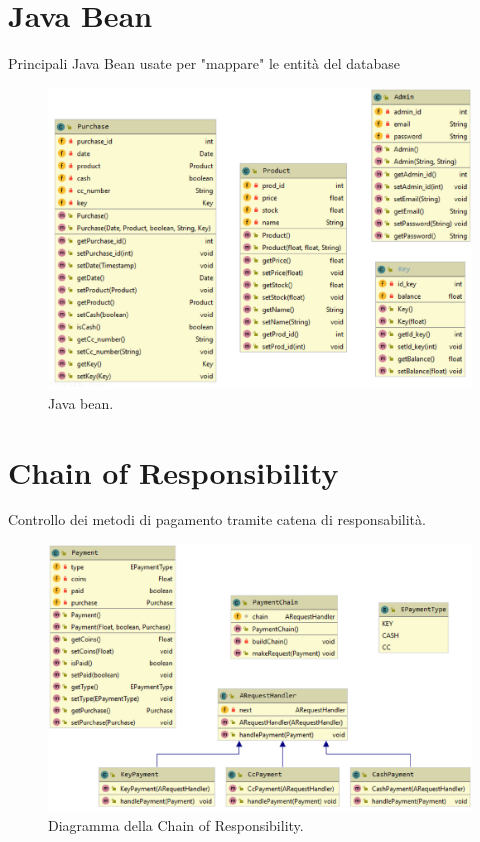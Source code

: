\section{Java Bean}
Principali Java Bean usate per "mappare" le entit\`a del database
\begin{figure}[ht]
    \centering
    \includegraphics[scale=0.5]{img/javabean.eps}
    \caption{Java bean.}
\end{figure}
\newpage
\section{Chain of Responsibility}
Controllo dei metodi di pagamento tramite catena di responsabilit\`a.
\begin{figure}[ht]
    \centering
    \includegraphics[scale=0.5]{img/cor.eps}
    \caption{Diagramma della Chain of Responsibility.}
\end{figure}
\newpage
